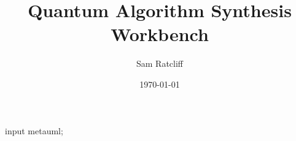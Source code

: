 \documentclass[authoryearcitations]{UoYCSproject}
\author{Sam Ratcliff}
\title{Quantum Algorithm Synthesis Workbench}
\date{\today}
\begin{document}
\begin{empfile}
\begin{empcmds}
input metauml;
\end{empcmds}

\maketitle
\listoffigures
\listoftables








% 









\appendix



\end{empfile}
\end{document}
